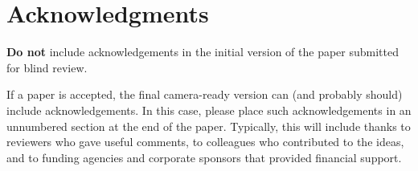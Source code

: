 \documentclass{article}
\begin{document}
\section*{Acknowledgments} 
 
\textbf{Do not} include acknowledgements in the initial version of
the paper submitted for blind review.

If a paper is accepted, the final camera-ready version can (and
probably should) include acknowledgements. In this case, please
place such acknowledgements in an unnumbered section at the
end of the paper. Typically, this will include thanks to reviewers
who gave useful comments, to colleagues who contributed to the ideas, 
and to funding agencies and corporate sponsors that provided financial 
support.  


\nocite{Bendall:2011bm}



\end{document}
